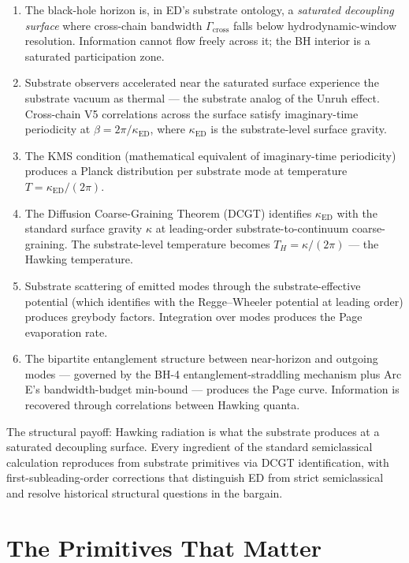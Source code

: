\documentclass[11pt,a4paper]{article}
\begin{document}
\begin{enumerate}[noitemsep]
  \item The black-hole horizon is, in ED's substrate ontology, a \emph{saturated decoupling surface} where cross-chain bandwidth $\Gamma_{\mathrm{cross}}$ falls below hydrodynamic-window resolution. Information cannot flow freely across it; the BH interior is a saturated participation zone.
  \item Substrate observers accelerated near the saturated surface experience the substrate vacuum as thermal --- the substrate analog of the Unruh effect. Cross-chain V5 correlations across the surface satisfy imaginary-time periodicity at $\beta = 2\pi/\kappa_{\mathrm{ED}}$, where $\kappa_{\mathrm{ED}}$ is the substrate-level surface gravity.
  \item The KMS condition (mathematical equivalent of imaginary-time periodicity) produces a Planck distribution per substrate mode at temperature $T = \kappa_{\mathrm{ED}}/(2\pi)$.
  \item The Diffusion Coarse-Graining Theorem (DCGT) identifies $\kappa_{\mathrm{ED}}$ with the standard surface gravity $\kappa$ at leading-order substrate-to-continuum coarse-graining. The substrate-level temperature becomes $T_H = \kappa/(2\pi)$ --- the Hawking temperature.
  \item Substrate scattering of emitted modes through the substrate-effective potential (which identifies with the Regge--Wheeler potential at leading order) produces greybody factors. Integration over modes produces the Page evaporation rate.
  \item The bipartite entanglement structure between near-horizon and outgoing modes --- governed by the BH-4 entanglement-straddling mechanism plus Arc E's bandwidth-budget min-bound --- produces the Page curve. Information is recovered through correlations between Hawking quanta.
\end{enumerate}

The structural payoff: Hawking radiation is what the substrate produces at a saturated decoupling surface. Every ingredient of the standard semiclassical calculation reproduces from substrate primitives via DCGT identification, with first-subleading-order corrections that distinguish ED from strict semiclassical and resolve historical structural questions in the bargain.

\section{The Primitives That Matter}
\end{document}
